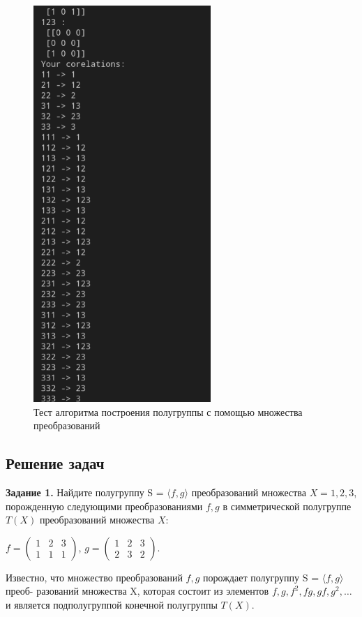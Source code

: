 \documentclass[bachelor, och, labwork]{shiza}
\begin{document}
      \begin{figure}[H]
        \centering
        \includegraphics[width=0.6\textwidth]{photo/6.png}
        \caption{Тест алгоритма построения полугруппы с помощью множества преобразований}
      \end{figure}

    \subsection{Решение задач}
      \textbf{Задание 1.} Найдите полугруппу S = $\langle f, g \rangle$ преобразований множества $X = {1, 2, 3}$,
      порожденную следующими преобразованиями $f, g$ в симметрической полугруппе $T(X)$ преобразований множества $X$:
      \begin{center}
        $f = \begin{pmatrix}
          1 & 2 & 3 \\
          1 & 1 & 1
      \end{pmatrix}$,
        $g = \begin{pmatrix}
          1 & 2 & 3 \\
          2 & 3 & 2
        \end{pmatrix}$.
      \end{center}
    Известно, что множество преобразований $f, g$ порождает полугруппу S = $\langle f, g \rangle$ преоб-
    разований множества X, которая состоит из элементов $f, g, f^2 , fg, gf, g^2 , \dots $ и
    является подполугруппой конечной полугруппы $T(X)$.
\end{document}

